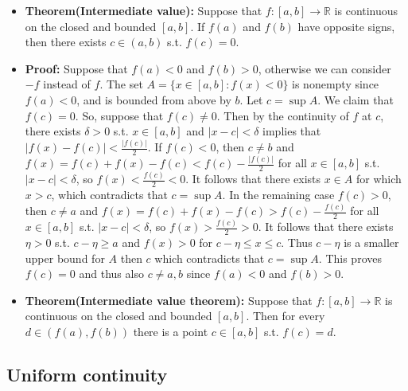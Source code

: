 \documentclass{article}
\begin{document}
\begin{itemize}
\item \textbf{Theorem(Intermediate value):} Suppose that $f: [a, b] \to \mathbb{R}$ is continuous on the closed and bounded $[a, b]$. If $f(a)$ and $f(b)$ have opposite signs, then there exists $c \in (a, b)$ s.t. $f(c) = 0$.

\item \textbf{Proof:} Suppose that $f(a) < 0$ and $f(b) > 0$, otherwise we can consider $-f$ instead of $f$. The set $A = \{x \in [a, b]: f(x) < 0\}$ is nonempty since $f(a) < 0$, and is bounded from above by $b$. Let $c = \sup A$. We claim that $f(c) = 0$. So, suppose that $f(c) \neq 0$. Then by the continuity of $f$ at $c$, there exists $\delta > 0$ s.t. $x \in [a, b]$ and $|x - c| < \delta$ implies that $|f(x) - f(c)| < \frac{|f(c)|}{2}$. If $f(c) < 0$, then $c \neq b$ and $f(x) = f(c) + f(x) - f(c) < f(c) - \frac{|f(c)|}{2}$ for all $x \in [a, b]$ s.t. $|x - c| < \delta$, so $f(x) < \frac{f(c)}{2} < 0$. It follows that there exists $x \in A$ for which $x > c$, which contradicts that $c = \sup A$. In the remaining case $f(c) > 0$, then $c \neq a$ and $f(x) = f(c) + f(x) - f(c) > f(c) - \frac{f(c)}{2}$ for all $x \in [a, b]$ s.t. $|x - c| < \delta$, so $f(x) > \frac{f(c)}{2} > 0$. It follows that there exists $\eta > 0$ s.t. $c - \eta \geq a$ and $f(x) > 0$ for $c - \eta \leq x \leq c$. Thus $c - \eta$ is a smaller upper bound for $A$ then $c$ which contradicts that $c = \sup A$. This proves $f(c) = 0$ and thus also $c \neq a,b$ since $f(a) < 0$ and $f(b) > 0$.

\item \textbf{Theorem(Intermediate value theorem):} Suppose that $f: [a, b] \to \mathbb{R}$ is continuous on the closed and bounded $[a, b]$. Then for every $d \in (f(a),f(b))$ there is a point $c \in [a, b]$ s.t. $f(c) = d$.
\end{itemize}

\subsection{Uniform continuity}
\end{document}
